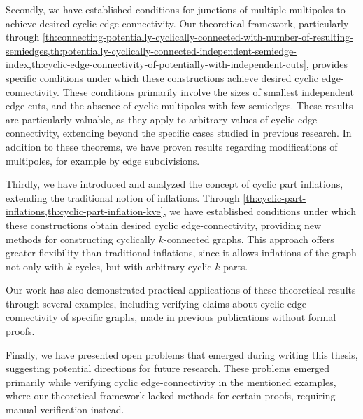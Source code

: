 \documentclass[12pt, twoside]{book}
\begin{document}
Secondly, we have established conditions for junctions of multiple multipoles to achieve desired cyclic edge-connectivity. Our theoretical framework, particularly through \cref{th:connecting-potentially-cyclically-connected-with-number-of-resulting-semiedges,th:potentially-cyclically-connected-independent-semiedge-index,th:cyclic-edge-connectivity-of-potentially-with-independent-cuts}, provides specific conditions under which these constructions achieve desired cyclic edge-connectivity. These conditions primarily involve the sizes of smallest independent edge-cuts, and the absence of cyclic multipoles with few semiedges. These results are particularly valuable, as they apply to arbitrary values of cyclic \mbox{edge-connectivity}, extending beyond the specific cases studied in previous research. In addition to these theorems, we have proven results regarding modifications of multipoles, for example by edge subdivisions.

Thirdly, we have introduced and analyzed the concept of cyclic part inflations, extending the traditional notion of inflations. Through \cref{th:cyclic-part-inflations,th:cyclic-part-inflation-kve}, we have established conditions under which these constructions obtain desired cyclic \mbox{edge-connectivity}, providing new methods for constructing cyclically $k$-connected graphs. This approach offers greater flexibility than traditional inflations, since it allows inflations of the graph not only with $k$-cycles, but with arbitrary cyclic $k$-parts.

Our work has also demonstrated practical applications of these theoretical results through several examples, including verifying claims about cyclic edge-connectivity of specific graphs, made in previous publications without formal proofs.

Finally, we have presented open problems that emerged during writing this thesis, suggesting potential directions for future research. These problems emerged primarily while verifying cyclic edge-connectivity in the mentioned examples, where our theoretical framework lacked methods for certain proofs, requiring manual verification instead.

\newpage
\thispagestyle{empty}




\end{document}
